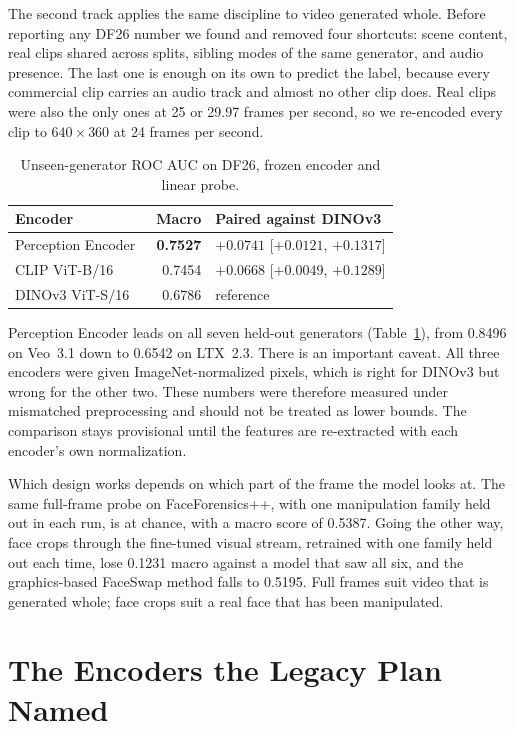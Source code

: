 The second track applies the same discipline to video generated whole. Before
reporting any DF26 number we found and removed four shortcuts: scene content,
real clips shared across splits, sibling modes of the same generator, and
audio presence. The last one is enough on its own to predict the label, because
every commercial clip carries an audio track and almost no other clip does. Real
clips were also the only ones at 25 or 29.97 frames per second, so we
re-encoded every clip to $640\times360$ at 24 frames per second.

\begin{table}[ht]
    \centering
    \caption{Unseen-generator ROC AUC on DF26, frozen encoder and linear probe.}
    \label{tab:df26}
    \begin{tabular}{lrl}
        \toprule
        \textbf{Encoder} & \textbf{Macro} & \textbf{Paired against DINOv3} \\
        \midrule
        Perception Encoder~\cite{pe} & \textbf{0.7527} & $+0.0741$ [$+0.0121$, $+0.1317$] \\
        CLIP ViT-B/16~\cite{clip} & 0.7454 & $+0.0668$ [$+0.0049$, $+0.1289$] \\
        DINOv3 ViT-S/16 & 0.6786 & reference \\
        \bottomrule
    \end{tabular}
\end{table}

Perception Encoder leads on all seven held-out generators
(Table~\ref{tab:df26}), from 0.8496 on Veo~3.1 down to 0.6542 on LTX~2.3. There
is an important caveat. All three encoders were given ImageNet-normalized
pixels, which is right for DINOv3 but wrong for the other two. These numbers
were therefore measured under mismatched preprocessing and should not be
treated as lower bounds. The comparison stays provisional until the features
are re-extracted with each encoder's own normalization.

Which design works depends on which part of the frame the model looks at. The
same full-frame probe on FaceForensics++, with one manipulation family held out
in each run, is at chance, with a macro score of 0.5387. Going the other way,
face crops through the fine-tuned visual stream, retrained with one family
held out each time, lose 0.1231 macro against a model that saw all six, and the
graphics-based FaceSwap method falls to 0.5195. Full frames suit video that is
generated whole; face crops suit a real face that has been manipulated.

\section{The Encoders the Legacy Plan Named}

